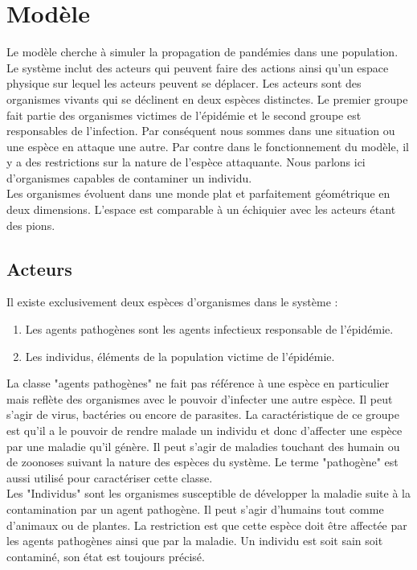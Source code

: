 \chapter{Modèle} \label{ch:modele}

Le modèle cherche à simuler la propagation de pandémies dans une population. Le système inclut des acteurs qui peuvent faire des actions ainsi qu'un espace physique sur lequel les acteurs peuvent se déplacer. Les acteurs sont des organismes vivants qui se déclinent en deux espèces distinctes. Le premier groupe fait partie des organismes victimes de l'épidémie et le second groupe est responsables de l'infection. Par conséquent nous sommes dans une situation ou une espèce en attaque une autre. Par contre dans le fonctionnement du modèle, il y a des restrictions sur la nature de l'espèce attaquante. Nous parlons ici d'organismes capables de contaminer un individu. \\

Les organismes évoluent dans une monde plat et parfaitement géométrique en deux dimensions. L'espace est comparable à un échiquier avec les acteurs étant des pions.

\section{Acteurs}

Il existe exclusivement deux espèces d'organismes dans le système :

\begin{enumerate}
	\item Les agents pathogènes sont les agents infectieux responsable de l'épidémie.
	\item Les individus, éléments de la population victime de l'épidémie.
\end{enumerate}

La classe "agents pathogènes" ne fait pas référence à une espèce en particulier mais reflète des organismes avec le pouvoir d'infecter une autre espèce. Il peut s'agir de virus, bactéries ou encore de parasites. La caractéristique de ce groupe est qu'il a le pouvoir de rendre malade un individu et donc d'affecter une espèce par une maladie qu'il génère. Il peut s'agir de maladies touchant des humain ou de zoonoses suivant la nature des espèces du système. Le terme "pathogène" est aussi utilisé pour caractériser cette classe.\\

Les "Individus" sont les organismes susceptible de développer la maladie suite à la contamination par un agent pathogène. Il peut s'agir d'humains tout comme d'animaux ou de plantes. La restriction est que cette espèce doit être affectée par les agents pathogènes ainsi que par la maladie. Un individu est soit sain soit contaminé, son état est toujours précisé.


